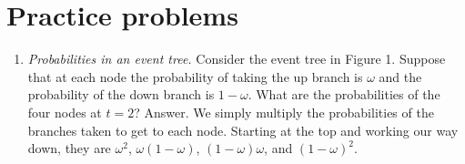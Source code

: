 \documentclass[11pt]{article}
\begin{document}
\section*{Practice problems}

\begin{enumerate}
\item {\it Probabilities in an event tree.\/}
Consider the event tree in Figure 1.  Suppose that at each node
the probability of taking the up branch is $\omega$ and the
probability of the down branch is $1-\omega$.
What are the probabilities of the four nodes at $t=2$?
%
Answer.
We simply multiply the probabilities
of the branches taken to get to each node.
Starting at the top and working our way down,
they are $ \omega^2 $, $ \omega (1-\omega)$, $ (1-\omega)\omega $,
and $(1-\omega)^2$.



\end{enumerate}
\end{document}
